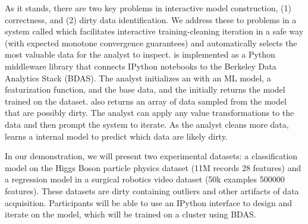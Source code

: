 As it stands, there are two key problems in interactive model construction, (1) correctness, and (2) dirty data identification.
We address these to problems in a system called \sys which facilitates interactive training-cleaning iteration in a safe way (with expected monotone convergence guarantees) and automatically selects the most valuable data for the analyst to inspect.
\sys is implemented as a Python middleware library that connects IPython notebooks to the Berkeley Data Analytics Stack (BDAS).
The analyst initializes an \sys with an ML model, a featurization function, and the base data, and the \sys initially returns the model trained on the dataset.
\sys also returns an array of data sampled from the model that are possibly dirty.
The analyst can apply any value transformations to the data and then prompt the system to iterate. 
As the analyst cleans more data, \sys learns a internal model to predict which data are likely dirty.

In our demonstration, we will present two experimental datasets: a classification model on the Higgs Boson particle physics dataset (11M records 28 features) and a regression model in a surgical robotics video dataset (50k examples 500000 features).
These datasets are dirty containing outliers and other artifacts of data acquisition.
Participants will be able to use an IPython interface to design and iterate on the model, which will be trained on a cluster using BDAS.
 









